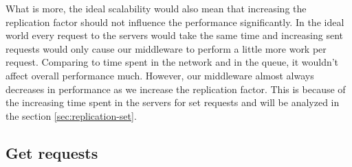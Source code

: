 \documentclass[11pt]{article}
\begin{document}
What is more, the ideal scalability would also mean that increasing the replication factor should not influence the performance significantly. In the ideal world every request to the servers would take the same time and increasing sent requests would only cause our middleware to perform a little more work per request. Comparing to time spent in the network and in the queue, it wouldn't affect overall performance much. However, our middleware almost always decreases in performance as we increase the replication factor. This is because of the increasing time spent in the servers for set requests and will be analyzed in the section \ref{sec:replication-set}.

\subsection{Get requests}
\label{sec:replication-get}
\end{document}

